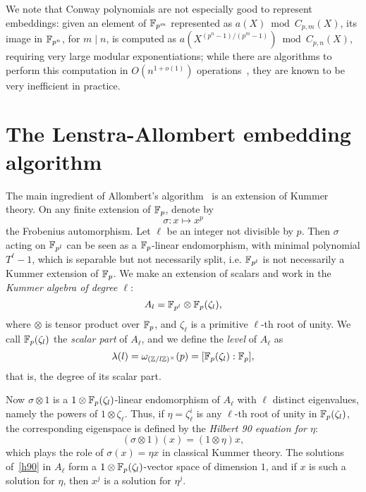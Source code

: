 \documentclass{sig-alternate}
\begin{document}
We note that Conway polynomials are not especially good to represent
embeddings: given an element of $\mathbb{F}_{p^m}$ represented as
$a(X) \bmod C_{p,m}(X)$, its image in $\mathbb{F}_{p^n}$, for $m\mid n$, is
computed as $a(X^{(p^n-1)/(p^m-1)})\bmod C_{p,n}(X)$, requiring very
large modular exponentiations; while there are algorithms to perform
this computation in $O(n^{1+o(1)})$ operations~\cite{KeUm11}, they are
known to be very inefficient in practice. %


\section{The Lenstra-Allombert embedding algorithm}
\label{sec:lenstra}
\cite{LenstraJr91}\cite{brieulle2018computing}


The main ingredient of Allombert's algorithm~\cite{Allombert02} is an extension
of Kummer theory.
On any finite extension of $\mathbb{F}_{p}$, denote by \[ \sigma:x\mapsto x^p \]
the Frobenius automorphism.
Let $\ell$ be an integer not divisible by $p$.
Then $\sigma$ acting on $\mathbb{F}_{p^l}$ can be seen as a $\mathbb{F}_{p}$-linear endomorphism,
with minimal polynomial $T^\ell-1$, which is separable but not necessarily split,
i.e. $\mathbb{F}_{p^l}$ is not necessarily a Kummer extension of $\mathbb{F}_{p}$.
We make an extension of scalars and work in the
\emph{Kummer algebra of degree $\ell$}:
\[
  A_l = \mathbb{F}_{p^l}\otimes\mathbb{F}_{p}(\zeta_l),
\]
where $\otimes$ is tensor product over $\mathbb{F}_{p}$, and $\zeta_\ell$ is a primitive $\ell$-th root of unity. We
call $\mathbb{F}_{p}(\zeta_l)$ the \emph{scalar part} of $A_\ell$, and
we define the \emph{level} of $A_\ell$ as
\[
  \lambda(l) = \omega_{(\mathbb{Z}/l\mathbb{Z})^\times}(p) = [\mathbb{F}_{p}(\zeta_l):\mathbb{F}_{p}],
\]
that is, the degree of its scalar part.

Now $\sigma\otimes1$ is a $1\otimes\mathbb{F}_{p}(\zeta_l)$-linear endomorphism of $A_\ell$
with $\ell$ distinct eigenvalues, namely the powers of $1\otimes\zeta_\ell$.
Thus, if $\eta=\zeta_\ell^i$ is any $\ell$-th root of unity in $\mathbb{F}_{p}(\zeta_l)$,
the corresponding eigenspace is defined by the \emph{Hilbert 90 equation for $\eta$}:
\begin{equation}
  \tag{H90}
 (\sigma\otimes1)(x) = (1\otimes\eta)x,
  \label{h90}
\end{equation}
which plays the role of $\sigma(x)=\eta x$ in classical Kummer theory.
The solutions of~\eqref{h90} in $A_\ell$ form a
$1\otimes\mathbb{F}_{p}(\zeta_{l})$-vector space of dimension $1$,
and if $x$ is such a solution for $\eta$, then $x^j$ is a solution for $\eta^j$.
\end{document}
